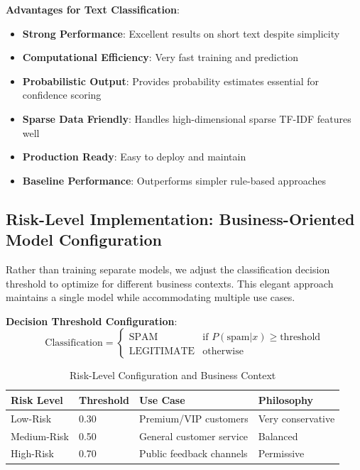 \documentclass[12pt,a4paper]{article}
\begin{document}
\textbf{Advantages for Text Classification}:
\begin{itemize}
    \item \textbf{Strong Performance}: Excellent results on short text despite simplicity
    \item \textbf{Computational Efficiency}: Very fast training and prediction
    \item \textbf{Probabilistic Output}: Provides probability estimates essential for confidence scoring
    \item \textbf{Sparse Data Friendly}: Handles high-dimensional sparse TF-IDF features well
    \item \textbf{Production Ready}: Easy to deploy and maintain
    \item \textbf{Baseline Performance}: Outperforms simpler rule-based approaches
\end{itemize}

\subsection{Risk-Level Implementation: Business-Oriented Model Configuration}

Rather than training separate models, we adjust the classification decision threshold to optimize for different business contexts. This elegant approach maintains a single model while accommodating multiple use cases.

\textbf{Decision Threshold Configuration}:
\begin{equation}
\text{Classification} = \begin{cases}
\text{SPAM} & \text{if } P(\text{spam}|x) \geq \text{threshold} \\
\text{LEGITIMATE} & \text{otherwise}
\end{cases}
\end{equation}

\begin{table}[H]
\centering
\begin{tabular}{llll}
\toprule
\textbf{Risk Level} & \textbf{Threshold} & \textbf{Use Case} & \textbf{Philosophy} \\
\midrule
Low-Risk & 0.30 & Premium/VIP customers & Very conservative \\
Medium-Risk & 0.50 & General customer service & Balanced \\
High-Risk & 0.70 & Public feedback channels & Permissive \\
\bottomrule
\end{tabular}
\caption{Risk-Level Configuration and Business Context}
\end{table}
\end{document}

